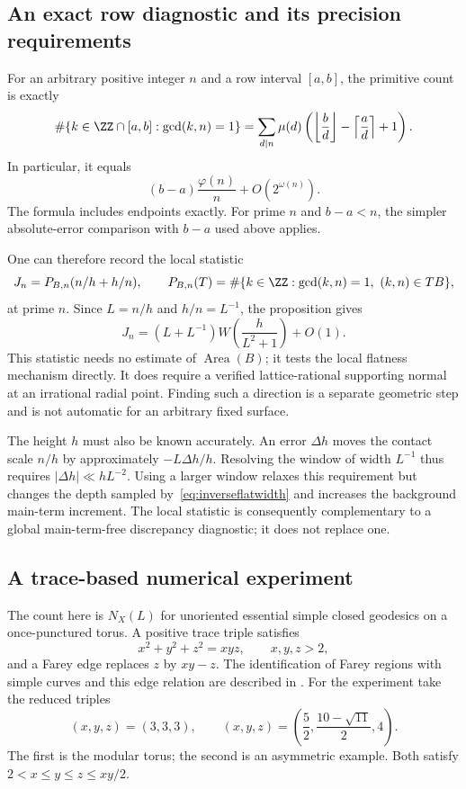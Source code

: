 \subsection{An exact row diagnostic and its precision requirements}
\label{subsec:rowdiagnostic}

For an arbitrary positive integer $n$ and a row interval $[a,b]$, the
primitive count is exactly
\begin{equation}
 \#\{k\in\ZZ\cap[a,b]:\gcd(k,n)=1\}
 =\sum_{d\mid n}\mu(d)
 \left(\left\lfloor\frac bd\right\rfloor
       -\left\lceil\frac ad\right\rceil+1\right).
 \label{eq:primitiveintervalexact}
\end{equation}
In particular, it equals
\[
 (b-a)\frac{\varphi(n)}n+O(2^{\omega(n)}).
\]
The formula includes endpoints exactly. For prime $n$ and $b-a<n$,
the simpler absolute-error comparison with $b-a$ used above applies.

One can therefore record the local statistic
\[
 J_n=P_{B,n}(n/h+h/n),\qquad
 P_{B,n}(T)=\#\{k\in\ZZ:\gcd(k,n)=1,\ (k,n)\in TB\},
\]
at prime $n$. Since $L=n/h$ and $h/n=L^{-1}$, the proposition gives
\[
 J_n=(L+L^{-1})W\!\left(\frac h{L^2+1}\right)+O(1).
\]
This statistic needs no estimate of $\operatorname{Area}(B)$; it tests
the local flatness mechanism directly. It does require a verified
lattice-rational supporting normal at an irrational radial point.
Finding such a direction is a separate geometric step and is not
automatic for an arbitrary fixed surface.

The height $h$ must also be known accurately. An error $\Delta h$ moves
the contact scale $n/h$ by approximately $-L\Delta h/h$. Resolving
the window of width $L^{-1}$ thus requires $|\Delta h|\ll hL^{-2}$.
Using a larger window relaxes this requirement but changes the depth
sampled by~\eqref{eq:inverseflatwidth} and increases the background
main-term increment. The local statistic is consequently complementary
to a global main-term-free discrepancy diagnostic; it does not replace
one.



\subsection{A trace-based numerical experiment}
\label{subsec:torustraceexperiment}

The count here is $N_X(L)$ for unoriented essential simple closed
geodesics on a once-punctured torus. A positive trace triple satisfies
\[
 x^2+y^2+z^2=xyz,\qquad x,y,z>2,
\]
and a Farey edge replaces $z$ by $xy-z$. The identification of Farey
regions with simple curves and this edge relation are described in
\cite[Sections~1--2]{BowditchMarkoff}. For the experiment take the reduced
triples
\begin{equation}
 (x,y,z)=(3,3,3),\qquad
 (x,y,z)=\left(\frac52,\frac{10-\sqrt{11}}2,4\right).
 \label{eq:diagnostictracetriples}
\end{equation}
The first is the modular torus; the second is an asymmetric example.
Both satisfy $2<x\le y\le z\le xy/2$.

